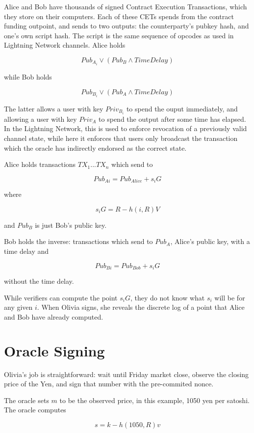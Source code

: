 \documentclass[11pt]{article}
\begin{document}
Alice and Bob have thousands of signed Contract Execution Transactions,  which they store on their computers.  Each of these CETs spends from the contract funding outpoint, and sends to two outputs: the counterparty's pubkey hash, and one's own script hash.  The script is the same sequence of opcodes as used in Lightning Network channels.  Alice holds

\[Pub_{A_i} \lor (Pub_{B} \land TimeDelay)\]

while Bob holds

\[Pub_{B_i} \lor (Pub_{A} \land TimeDelay)\]


The latter allows a user with key \(Priv_{B_i}\) to spend the ouput immediately, and allowing a user with key \(Priv_{A}\) to spend the output after some time has elapsed.  In the Lightning Network, this is used to enforce revocation of a previously valid  channel state,  while  here it enforces  that users only broadcast the transaction which the oracle has indirectly endorsed as the correct state.

Alice holds transactions \(TX_{1} ... TX_{n}\) which send to

\[Pub_{Ai} = Pub_{Alice} + s_iG\]

where 

\[s_iG = R - h(i, R)V\]

and \(Pub_B\) is just Bob's public key.

Bob holds the inverse: transactions which send to \(Pub_A\), Alice's public key, with a time delay and 

\[Pub_{Bi} = Pub_{Bob} + s_iG\]

without the time delay.

While verifiers can compute the point \(s_iG\), they do not know what \(s_i\) will be for any given \(i\).  When Olivia signs, she reveals the discrete log of a point that Alice and Bob have already computed.

\section*{Oracle Signing}

Olivia's job is straightforward: wait until Friday market close, observe the closing price of the Yen, and sign that number with the pre-commited nonce.

The oracle sets \(m\) to be the observed price, in this example, 1050 yen per satoshi.  The oracle computes

\[s = k - h(1050, R)v\]
\end{document}
